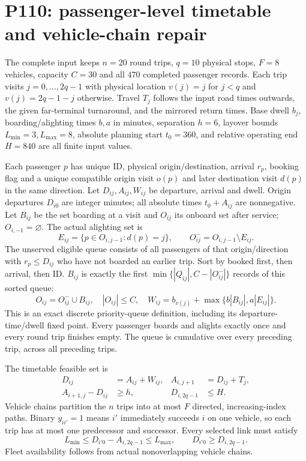\documentclass[11pt]{article}
\begin{document}
\section*{P110: passenger-level timetable and vehicle-chain repair}
The complete input keeps $n=20$ round trips, $q=10$ physical stops,
$F=8$ vehicles, capacity $C=30$ and all $470$ completed passenger records.
Each trip visits $j=0,\ldots,2q-1$ with physical location
$v(j)=j$ for $j<q$ and $v(j)=2q-1-j$ otherwise.
Travel $T_j$ follows the input road times outwards, the given far-terminal
turnaround, and the mirrored return times. Base dwell $b_j$,
boarding/alighting times $b,a$ in minutes, separation $h=6$,
layover bounds $L_{\min}=3,L_{\max}=8$, absolute planning start $t_0=360$,
and relative operating end $H=840$ are all finite input values.

Each passenger $p$ has unique ID, physical origin/destination, arrival $r_p$,
booking flag and a unique compatible origin visit $o(p)$ and later destination
visit $d(p)$ in the same direction. Let $D_{ij},A_{ij},W_{ij}$
be departure, arrival and dwell. Origin departures $D_{i0}$ are integer minutes;
all absolute times $t_0+A_{ij}$ are nonnegative.
Let $B_{ij}$ be the set boarding at a visit and $O_{ij}$ its onboard set after
service; $O_{i,-1}=\varnothing$. The actual alighting set is
\[
E_{ij}=\{p\in O_{i,j-1}:d(p)=j\},\qquad
O^-_{ij}=O_{i,j-1}\setminus E_{ij}.
\]
The unserved eligible queue consists of all passengers of that origin/direction
with $r_p\le D_{ij}$ who have not boarded an earlier trip. Sort by booked first,
then arrival, then ID. $B_{ij}$ is exactly the first
$\min\{|Q_{ij}|,C-|O^-_{ij}|\}$ records of this sorted queue:
\[
O_{ij}=O^-_{ij}\cup B_{ij},\quad |O_{ij}|\le C,\quad
W_{ij}=b_{v(j)}+\max\{b|B_{ij}|,a|E_{ij}|\}.
\]
This is an exact discrete priority-queue definition, including its
departure-time/dwell fixed point. Every passenger boards and alights exactly
once and every round trip finishes empty. The queue is cumulative over every
preceding trip, across all preceding trips.

The timetable feasible set is
\begin{align}
D_{ij}&=A_{ij}+W_{ij},&
A_{i,j+1}&=D_{ij}+T_j,\\
A_{i+1,j}-D_{ij}&\ge h,&
D_{i,2q-1}&\le H.
\end{align}
Vehicle chains partition the $n$ trips into at most $F$ directed, increasing-index
paths. Binary $y_{ii'}=1$ means $i'$ immediately succeeds $i$ on one vehicle,
so each trip has at most one predecessor and successor. Every selected link
must satisfy
\[
L_{\min}\le D_{i'0}-A_{i,2q-1}\le L_{\max},\qquad
D_{i'0}\ge D_{i,2q-1}.
\]
Fleet availability follows from actual nonoverlapping vehicle chains.
\end{document}
